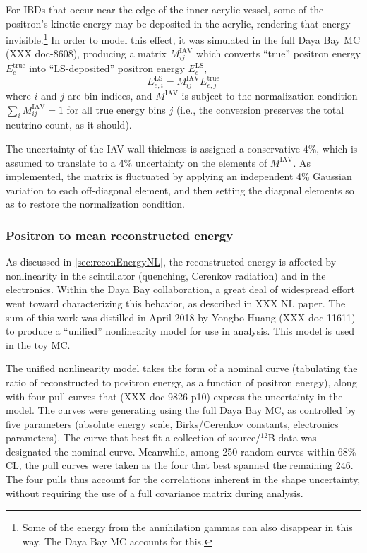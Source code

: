 \documentclass[../thesis.tex]{subfiles}
\begin{document}
\newcommand\Miav{M^{\mathrm{IAV}}}
\newcommand\Eetrue[1]{E^{\mathrm{true}}_{e#1}}
\newcommand\Eels[1]{E^{\mathrm{LS}}_{e#1}}

For IBDs that occur near the edge of the inner acrylic vessel, some of the
positron's kinetic energy may be deposited in the acrylic, rendering that energy
invisible.\footnote{Some of the energy from the annihilation gammas can also
  disappear in this way. The Daya Bay MC accounts for this.} In order to model
this effect, it was simulated in the full Daya Bay MC (XXX doc-8608), producing
a matrix $\Miav_{ij}$ which converts ``true'' positron energy $\Eetrue{}$ into
``LS-deposited'' positron energy $\Eels{}$,
\begin{equation*}
  \Eels{,i} = \Miav_{ij} \Eetrue{,j}
\end{equation*}
where $i$ and $j$ are bin indices, and $\Miav$ is subject to the normalization
condition $\sum_i\Miav_{ij} = 1$ for all true energy bins $j$ (i.e., the
conversion preserves the total neutrino count, as it should).

The uncertainty of the IAV wall thickness is assigned a conservative 4\%, which
is assumed to translate to a 4\% uncertainty on the elements of $\Miav$. As
implemented, the matrix is fluctuated by applying an independent 4\% Gaussian
variation to each off-diagonal element, and then setting the diagonal elements
so as to restore the normalization condition.

\subsubsection{Positron to mean reconstructed energy}

As discussed in \autoref{sec:reconEnergyNL}, the reconstructed energy is
affected by nonlinearity in the scintillator (quenching, Cerenkov radiation) and
in the electronics. Within the Daya Bay collaboration, a great deal of
widespread effort went toward characterizing this behavior, as described in XXX
NL paper. The sum of this work was distilled in April 2018 by Yongbo Huang (XXX
doc-11611) to produce a ``unified'' nonlinearity model for use in analysis. This
model is used in the toy MC.

The unified nonlinearity model takes the form of a nominal curve (tabulating the
ratio of reconstructed to positron energy, as a function of positron energy),
along with four pull curves that (XXX doc-9826 p10) express the uncertainty in
the model. The curves were generating using the full Daya Bay MC, as controlled
by five parameters (absolute energy scale, Birks/Cerenkov constants, electronics
parameters). The curve that best fit a collection of source/$^{12}$B data was
designated the nominal curve. Meanwhile, among 250 random curves within 68\% CL,
the pull curves were taken as the four that best spanned the remaining 246. The
four pulls thus account for the correlations inherent in the shape uncertainty,
without requiring the use of a full covariance matrix during analysis.
\end{document}
